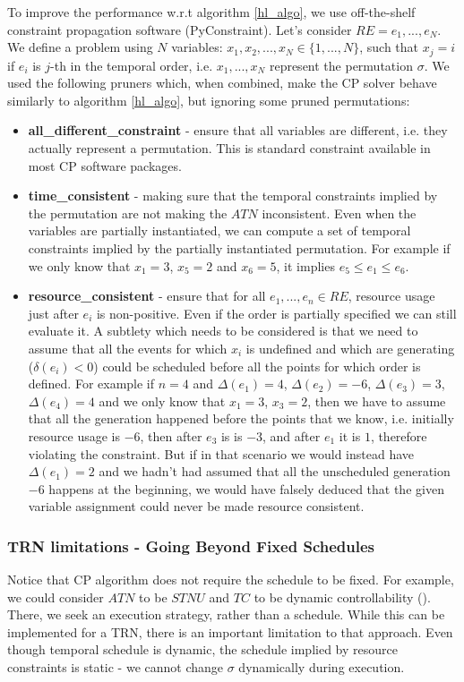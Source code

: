 To improve the performance w.r.t algorithm \ref{hl_algo}, we use off-the-shelf constraint propagation software (PyConstraint). Let's consider $RE={e_1, ..., e_N}$. We define a problem using $N$ variables:  $x_1, x_2, ..., x_N \in \{ 1, ..., N \}$, such that $x_j=i$ if $e_i$ is $j$-th in the temporal order, i.e. $x_1, ..., x_N$ represent the permutation $\sigma$. We used the following pruners which, when combined, make the CP solver behave similarly to algorithm \ref{hl_algo}, but ignoring some pruned permutations:
\begin{itemize}
\setlength\itemsep{0.2em}
\item \textbf{all\_different\_constraint} - ensure that all variables are different, i.e. they actually represent a permutation. This is standard constraint available in most CP software packages.
\item \textbf{time\_consistent} - making sure that the temporal constraints implied by the permutation are not making the $ATN$ inconsistent. Even when the variables are partially instantiated, we can compute a set of temporal constraints implied by the partially instantiated permutation. For example if we only know that $x_1 = 3$, $x_5 = 2$ and $x_6=5$, it implies $e_5 \leq e_1 \leq e_6$.
\item \textbf{resource\_consistent} - ensure that for all $e_1, ..., e_n \in RE$, resource usage just after $e_i$ is non-positive. Even if the order is partially specified we can still evaluate it. A subtlety which needs to be considered is that we need to assume that all the events for which $x_i$ is undefined and which are generating ($\delta(e_i) < 0$) could be scheduled before all the points for which order is defined. For example if $n = 4$ and $\Delta(e_1) = 4$, $\Delta(e_2) = -6$, $\Delta(e_3) = 3$, $\Delta(e_4) = 4$ and we only know that $x_1 = 3$, $x_3 = 2$, then we have to assume that all the generation happened before the points that we know, i.e. initially resource usage is $-6$, then after $e_3$ is is $-3$, and after $e_1$ it is $1$, therefore violating the constraint. But if in that scenario we would instead have $\Delta(e_1) = 2$ and we hadn't had assumed that all the unscheduled generation $-6$ happens at the beginning, we would have falsely deduced that the given variable assignment could never be made resource consistent.
\end{itemize}

\subsubsection{TRN limitations - Going Beyond Fixed Schedules}
Notice that CP algorithm does not require the schedule to be fixed. For example, we could consider $ATN$ to be $STNU$ and $TC$ to be dynamic controllability (\cite{vidal1996dealing}). There, we seek an execution strategy, rather than a schedule. While this can be implemented for a TRN, there is an important limitation to that approach. Even though temporal schedule is dynamic, the schedule implied by resource constraints is static - we cannot change $\sigma$ dynamically during execution.

